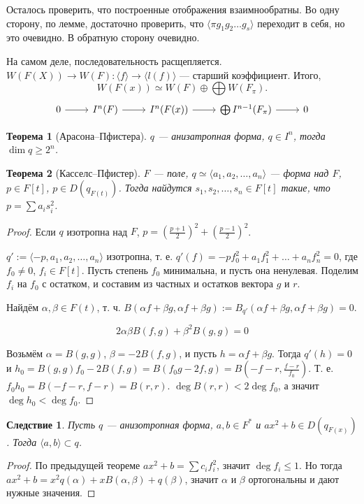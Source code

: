 \documentclass{article}
\newenvironment{cd}{\begin{equation*}\begin{tikzcd}}{\end{tikzcd}\end{equation*}}
\newtheorem*{theorem}{Теорема}
\newtheorem*{corollary}{Следствие}
\theoremstyle{definition}
\theoremstyle{remark}
\begin{document}
Осталось проверить, что построенные отображения взаимнообратны. Во одну сторону, по лемме, достаточно проверить, что $\langle \pi g_1 g_2 \ldots g_s \rangle$ переходит в себя, но это очевидно. В обратную сторону очевидно.

На самом деле, последовательность расщепляется. $W(F(X)) \rightarrow W(F): \langle f \rangle \rightarrow \langle l(f) \rangle$ --- старший коэффициент. Итого,
$$W(F(x)) \simeq W(F) \oplus \bigoplus W(F_\pi).$$
\begin{cd}
0 \rar & I^n(F) \rar & I^n(F(x)) \rar & \bigoplus I^{n - 1}(F_\pi) \rar & 0
\end{cd}

\begin{theorem}[Арасона--Пфистера]
    $q$ --- анизатропная форма, $q \in I^n$, тогда $\dim q \geq 2^n$.
\end{theorem}

\begin{theorem}[Касселс--Пфистер]
    $F$ --- поле, $q \simeq \langle a_1, a_2, \ldots, a_n \rangle$ --- форма над $F$, $p \in F[t]$, $p \in D(q_{F(t)})$. Тогда найдутся $s_1, s_2, \ldots, s_n \in F[t]$ такие, что $p = \sum a_i s_i^2$.
\end{theorem}
\begin{proof}
    Если $q$ изотропна над $F$, $p = \left( \frac{p + 1}{2} \right)^2 + \left( \frac{p - 1}{2} \right)^2$.

    $q' := \langle -p, a_1, a_2, \ldots, a_n \rangle$ изотропна, т. е. $q'(f) = -pf_0^2 + a_1 f_1^2 + \ldots + a_n f_n^2 = 0$, где $f_0 \neq 0$, $f_i \in F[t]$. Пусть степень $f_0$ минимальна, и пусть она ненулевая. Поделим $f_i$ на $f_0$ с остатком, и составим из частных и остатков вектора $g$ и $r$.

    Найдём $\alpha, \beta \in F(t)$, т. ч. $B(\alpha f + \beta g, \alpha f + \beta g) := B_{q'}(\alpha f + \beta g, \alpha f + \beta g) = 0$.

    $$2\alpha \beta B(f, g) + \beta^2 B(g, g) = 0$$

    Возьмём $\alpha = B(g, g)$, $\beta = -2B(f, g)$, и пусть $h = \alpha f + \beta g$. Тогда $q'(h) = 0$ и $h_0 = B(g, g) f_0 - 2B(f, g) = B(f_0 g - 2f, g) = B(-f - r, \frac{f - r}{f_0})$. Т. е. $f_0 h_0 = B(-f - r, f - r) = B(r, r)$. $\deg B(r, r) < 2\deg f_0$, а значит $\deg h_0 < \deg f_0$. 
\end{proof}

\begin{corollary}
    Пусть $q$ --- анизотропная форма, $a, b \in F^*$ и $ax^2 + b \in D(q_{F(x)})$. Тогда $\langle a, b \rangle \subset q$.
\end{corollary}
\begin{proof}
    По предыдущей теореме $ax^2 + b = \sum c_i f_i^2$, значит $\deg f_i \leq 1$. Но тогда $ax^2 + b = x^2 q(\alpha) + x B(\alpha, \beta) + q(\beta)$, значит $\alpha$ и $\beta$ ортогональны и дают нужные значения.
\end{proof}
\end{document}
